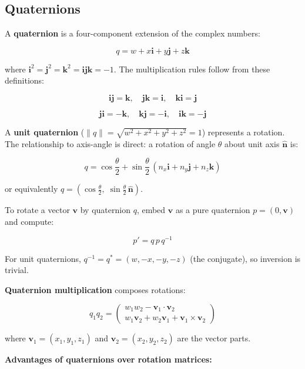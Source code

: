 \documentclass[
  11pt,
  letterpaper,
  DIV=11,
  numbers=noendperiod,
  twoside,
  open=right]{scrreprt}
\begin{document}
\subsection{Quaternions}\label{quaternions}

A \textbf{quaternion} is a four-component extension of the complex
numbers:

\[
q = w + x\mathbf{i} + y\mathbf{j} + z\mathbf{k}
\]

where
\(\mathbf{i}^2 = \mathbf{j}^2 = \mathbf{k}^2 = \mathbf{i}\mathbf{j}\mathbf{k} = -1\).
The multiplication rules follow from these definitions:

\[
\mathbf{i}\mathbf{j} = \mathbf{k}, \quad \mathbf{j}\mathbf{k} = \mathbf{i}, \quad \mathbf{k}\mathbf{i} = \mathbf{j}
\]

\[
\mathbf{j}\mathbf{i} = -\mathbf{k}, \quad \mathbf{k}\mathbf{j} = -\mathbf{i}, \quad \mathbf{i}\mathbf{k} = -\mathbf{j}
\]

A \textbf{unit quaternion}
(\(\|q\| = \sqrt{w^2 + x^2 + y^2 + z^2} = 1\)) represents a rotation.
The relationship to axis-angle is direct: a rotation of angle \(\theta\)
about unit axis \(\hat{\mathbf{n}}\) is:

\[
q = \cos\frac{\theta}{2} + \sin\frac{\theta}{2} \, (n_x \mathbf{i} + n_y \mathbf{j} + n_z \mathbf{k})
\]

or equivalently
\(q = (\cos\frac{\theta}{2}, \; \sin\frac{\theta}{2} \, \hat{\mathbf{n}})\).

To rotate a vector \(\mathbf{v}\) by quaternion \(q\), embed
\(\mathbf{v}\) as a pure quaternion \(p = (0, \mathbf{v})\) and compute:

\[
p' = q \, p \, q^{-1}
\]

For unit quaternions, \(q^{-1} = q^* = (w, -x, -y, -z)\) (the
conjugate), so inversion is trivial.

\textbf{Quaternion multiplication} composes rotations:

\[
q_1 q_2 = \begin{pmatrix}
  w_1 w_2 - \mathbf{v}_1 \cdot \mathbf{v}_2 \\
  w_1 \mathbf{v}_2 + w_2 \mathbf{v}_1 + \mathbf{v}_1 \times \mathbf{v}_2
\end{pmatrix}
\]

where \(\mathbf{v}_1 = (x_1, y_1, z_1)\) and
\(\mathbf{v}_2 = (x_2, y_2, z_2)\) are the vector parts.

\textbf{Advantages of quaternions over rotation matrices:}
\end{document}

